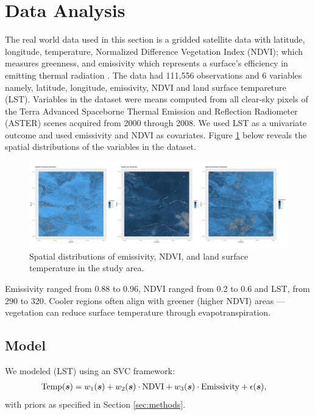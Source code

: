 \section{Data Analysis}
\label{sec:data analysis}
The real world data used in this section is a gridded satellite data with latitude, longitude, temperature, Normalized Difference Vegetation Index (NDVI); which measures greenness, and emissivity which represents a surface's efficiency in emitting thermal radiation \citep{hulley_new_2008, hulley_aster_2008, hulley_north_2009, hulley_validation_2009, hulley_generating_2011, hulley_quantifying_2012, nasa_jpl_aster_2014, hulley_span_2015}.
The data had 111,556 observations and 6 variables namely, latitude, longitude, emissivity, NDVI and land surface tempareture (LST). Variables in the dataset were means computed from all clear-sky pixels of the Terra Advanced Spaceborne Thermal Emission and Reflection Radiometer (ASTER) scenes acquired from 2000 through 2008.
We used LST as a univariate outcome and used emissivity and NDVI as covariates.
Figure \ref{fig:spatialpatterns} below reveals the spatial  distributions of the variables in the dataset.

 \begin{figure}[H]
 \centering
 \includegraphics[width=\textwidth]{../../figures/spatial_horizontal_stack.png}
 \caption{
   Spatial distributions of emissivity, NDVI, and  land surface temperature in the study area. 
 }
 \label{fig:spatialpatterns}
 \end{figure}
 
  Emissivity ranged from 0.88 to 0.96, NDVI ranged from 0.2 to 0.6  and LST, from 290 to 320.  
 Cooler regions often align with greener (higher NDVI) areas — vegetation can reduce surface temperature through evapotranspiration.
\subsection{Model}
We modeled (LST) using an SVC framework:
\begin{align*}
\text{Temp}(\boldsymbol{s}) &= w_1(\boldsymbol{s}) + w_2(\boldsymbol{s})\cdot\text{NDVI} + w_3(\boldsymbol{s})\cdot\text{Emissivity} + \epsilon(\boldsymbol{s}),
\end{align*}
with priors as specified in Section \ref{sec:methods}.

